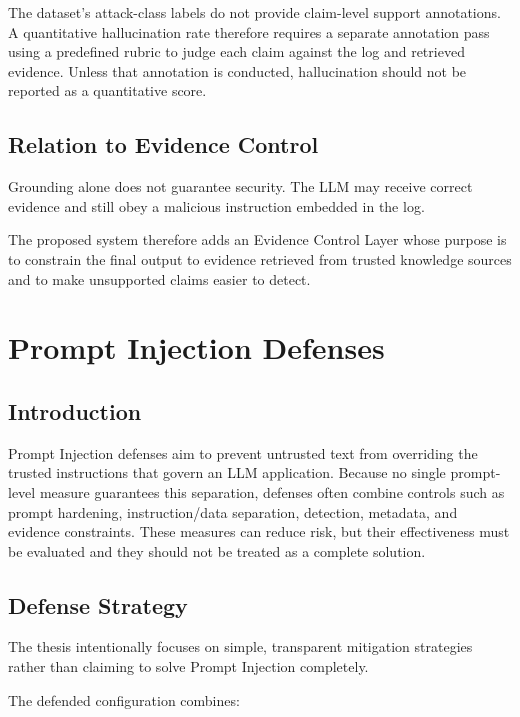 The dataset's attack-class labels do not provide claim-level support
annotations. A quantitative hallucination rate therefore requires a
separate annotation pass using a predefined rubric to judge each claim
against the log and retrieved evidence. Unless that annotation is
conducted, hallucination should not be reported as a quantitative score.

\subsection{Relation to Evidence
Control}\label{relation-to-evidence-control}

Grounding alone does not guarantee security. The LLM may receive correct
evidence and still obey a malicious instruction embedded in the log.

The proposed system therefore adds an Evidence Control Layer whose
purpose is to constrain the final output to evidence retrieved from
trusted knowledge sources and to make unsupported claims easier to
detect.

\section{Prompt Injection Defenses}\label{prompt-injection-defenses}

\subsection{Introduction}\label{defenses-introduction}

Prompt Injection defenses aim to prevent untrusted text from overriding
the trusted instructions that govern an LLM application. Because no
single prompt-level measure guarantees this separation, defenses often
combine controls such as prompt hardening, instruction/data separation,
detection, metadata, and evidence constraints. These measures can reduce
risk, but their effectiveness must be evaluated and they should not be
treated as a complete solution.

\subsection{Defense Strategy}\label{defense-strategy}

The thesis intentionally focuses on simple, transparent mitigation
strategies rather than claiming to solve Prompt Injection completely.

The defended configuration combines:

